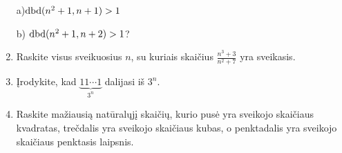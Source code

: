 \begin{enumerate}
    a)$\operatorname{dbd}(n^2+1,n+1)>1$

    b) $\operatorname{dbd}(n^2+1,n+2)>1$?  

  \item {} Raskite visus sveikuosius $n$, su kuriais
    skaičius $\frac{n^3+3}{n^2+7}$ yra sveikasis.
  \item Įrodykite, kad $\underbrace{11\cdots1}_{3^n}$ dalijasi iš $3^n$.  
  \item \text{[LitKo 2002]} Raskite mažiausią natūralųjį skaičių, kurio
    pusė yra sveikojo skaičiaus kvadratas, trečdalis yra sveikojo skaičiaus
    kubas, o penktadalis yra sveikojo skaičiaus penktasis laipsnis.

\end{enumerate}
